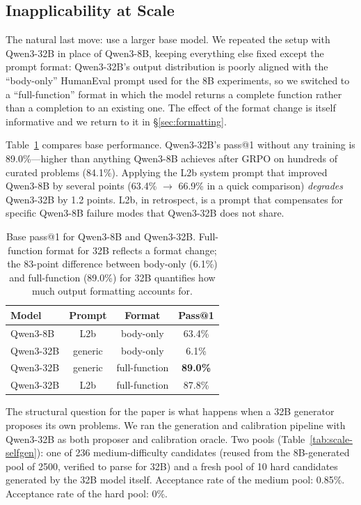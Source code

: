 \documentclass[11pt,a4paper]{article}
\begin{document}
\subsection{Inapplicability at Scale}
\label{sec:limits-scale}

The natural last move: use a larger base model.
We repeated the setup with Qwen3-32B in place of Qwen3-8B, keeping everything else fixed except the prompt format: Qwen3-32B's output distribution is poorly aligned with the ``body-only'' HumanEval prompt used for the 8B experiments, so we switched to a ``full-function'' format in which the model returns a complete function rather than a completion to an existing one.
The effect of the format change is itself informative and we return to it in \S\ref{sec:formatting}.

Table~\ref{tab:scale} compares base performance.
Qwen3-32B's pass@1 without any training is 89.0\%---higher than anything Qwen3-8B achieves after GRPO on hundreds of curated problems (84.1\%).
Applying the L2b system prompt that improved Qwen3-8B by several points (63.4\% $\to$ 66.9\% in a quick comparison) \emph{degrades} Qwen3-32B by 1.2 points.
L2b, in retrospect, is a prompt that compensates for specific Qwen3-8B failure modes that Qwen3-32B does not share.

\begin{table}[ht]
\centering
\caption{Base pass@1 for Qwen3-8B and Qwen3-32B. Full-function format for 32B reflects a format change; the 83-point difference between body-only (6.1\%) and full-function (89.0\%) for 32B quantifies how much output formatting accounts for.}
\label{tab:scale}
\begin{tabular}{lccc}
\toprule
Model & Prompt & Format & Pass@1 \\
\midrule
Qwen3-8B & L2b & body-only & 63.4\% \\
Qwen3-32B & generic & body-only & 6.1\% \\
Qwen3-32B & generic & full-function & \textbf{89.0\%} \\
Qwen3-32B & L2b & full-function & 87.8\% \\
\bottomrule
\end{tabular}
\end{table}

The structural question for the paper is what happens when a 32B generator proposes its own problems.
We ran the generation and calibration pipeline with Qwen3-32B as both proposer and calibration oracle.
Two pools (Table~\ref{tab:scale-selfgen}): one of 236 medium-difficulty candidates (reused from the 8B-generated pool of 2500, verified to parse for 32B) and a fresh pool of 10 hard candidates generated by the 32B model itself.
Acceptance rate of the medium pool: 0.85\%.
Acceptance rate of the hard pool: 0\%.
\end{document}
